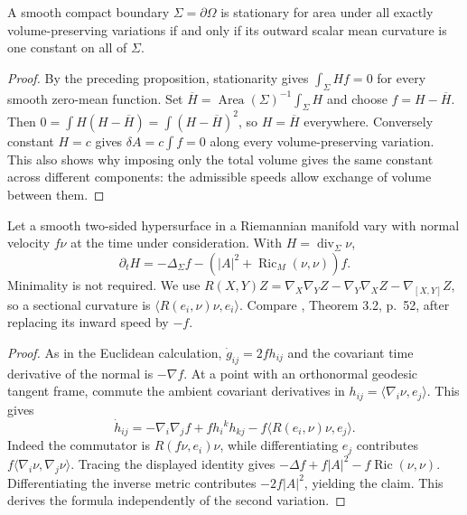 \begin{proposition}\label{prop:fixed-volume-cmc}
A smooth compact boundary $\Sigma=\partial\Omega$ is stationary for area under all exactly volume-preserving variations if and only if its outward scalar mean curvature is one constant on all of $\Sigma$.
\end{proposition}
\begin{proof}
By the preceding proposition, stationarity gives $\int_\Sigma Hf=0$ for every smooth zero-mean function. Set $\overline H=\operatorname{Area}(\Sigma)^{-1}\int_\Sigma H$ and choose $f=H-\overline H$. Then
$0=\int H(H-\overline H)=\int(H-\overline H)^2$, so $H=\overline H$ everywhere. Conversely constant $H=c$ gives $\delta A=c\int f=0$ along every volume-preserving variation. This also shows why imposing only the total volume gives the same constant across different components: the admissible speeds allow exchange of volume between them.
\end{proof}

\begin{proposition}\label{prop:riemannian-mean-curvature-variation}
Let a smooth two-sided hypersurface in a Riemannian manifold vary with normal velocity $f\nu$ at the time under consideration. With $H=\operatorname{div}_\Sigma\nu$,
\[
 \partial_tH=-\Delta_\Sigma f-(|A|^2+\operatorname{Ric}_M(\nu,\nu))f.
\]
Minimality is not required. We use $R(X,Y)Z=\nabla_X\nabla_YZ-\nabla_Y\nabla_XZ-\nabla_{[X,Y]}Z$, so a sectional curvature is $\langle R(e_i,\nu)\nu,e_i\rangle$. Compare \cite{HP99}, Theorem 3.2, p.~52, after replacing its inward speed by $-f$.
\end{proposition}
\begin{proof}
As in the Euclidean calculation, $\dot g_{ij}=2fh_{ij}$ and the covariant time derivative of the normal is $-\nabla f$. At a point with an orthonormal geodesic tangent frame, commute the ambient covariant derivatives in $h_{ij}=\langle\nabla_i\nu,e_j\rangle$. This gives
\[
 \dot h_{ij}=-\nabla_i\nabla_jf+fh_i{}^kh_{kj}
 -f\langle R(e_i,\nu)\nu,e_j\rangle.
\]
Indeed the commutator is $R(f\nu,e_i)\nu$, while differentiating $e_j$ contributes $f\langle\nabla_i\nu,\nabla_j\nu\rangle$. Tracing the displayed identity gives $-\Delta f+f|A|^2-f\operatorname{Ric}(\nu,\nu)$. Differentiating the inverse metric contributes $-2f|A|^2$, yielding the claim. This derives the formula independently of the second variation.
\end{proof}

